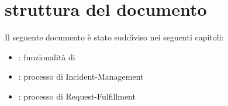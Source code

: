 %
%
\section[Struttura del documento]{struttura del documento}
\label{abs-document-structure}
Il seguente documento è stato suddiviso nei seguenti capitoli:

\begin{itemize}
\item{: funzionalità di }
\item{: processo di \acf{Incident-Management}}
\item{: processo di \acf{Request-Fulfillment}}
\end{itemize}